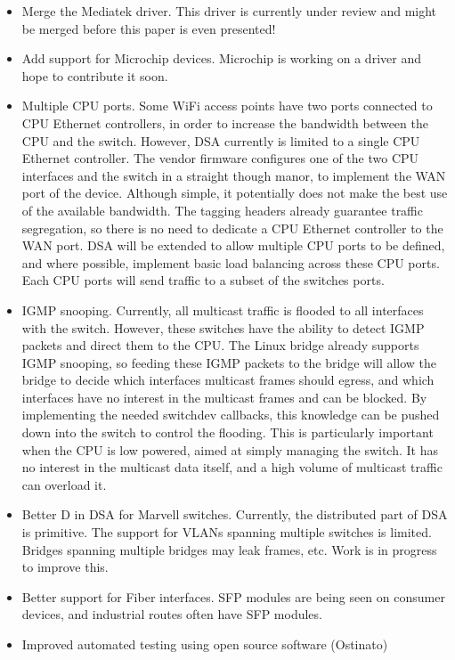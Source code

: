 \documentclass[letterpaper]{article}
\begin{document}
\begin{itemize}
\item Merge the Mediatek driver. This driver is currently under review
  and might be merged before this paper is even presented!
\item Add support for Microchip devices. Microchip is working on a
  driver and hope to contribute it soon.
\item Multiple CPU ports. Some WiFi access points have two ports
  connected to CPU Ethernet controllers, in order to increase the
  bandwidth between the CPU and the switch. However, DSA currently is
  limited to a single CPU Ethernet controller. The vendor firmware
  configures one of the two CPU interfaces and the switch in a
  straight though manor, to implement the WAN port of the
  device. Although simple, it potentially does not make the best use
  of the available bandwidth. The tagging headers already guarantee
  traffic segregation, so there is no need to dedicate a CPU Ethernet
  controller to the WAN port. DSA will be extended to allow multiple
  CPU ports to be defined, and where possible, implement basic load
  balancing across these CPU ports. Each CPU ports will send traffic
  to a subset of the switches ports.
\item IGMP snooping. Currently, all multicast traffic is flooded to
  all interfaces with the switch. However, these switches have the
  ability to detect IGMP packets and direct them to the CPU. The Linux
  bridge already supports IGMP snooping, so feeding these IGMP packets
  to the bridge will allow the bridge to decide which interfaces
  multicast frames should egress, and which interfaces have no
  interest in the multicast frames and can be blocked. By implementing
  the needed switchdev callbacks, this knowledge can be pushed down
  into the switch to control the flooding. This is particularly
  important when the CPU is low powered, aimed at simply managing the
  switch. It has no interest in the multicast data itself, and a high
  volume of multicast traffic can overload it.
\item Better D in DSA for Marvell switches. Currently, the distributed
  part of DSA is primitive. The support for VLANs spanning multiple
  switches is limited. Bridges spanning multiple bridges may leak
  frames, etc. Work is in progress to improve this.
\item Better support for Fiber interfaces. SFP modules are being seen
  on consumer devices, and industrial routes often have SFP modules.
\item Improved automated testing using open source software (Ostinato)
  \cite{ostinato}
\end{itemize}
\end{document}
